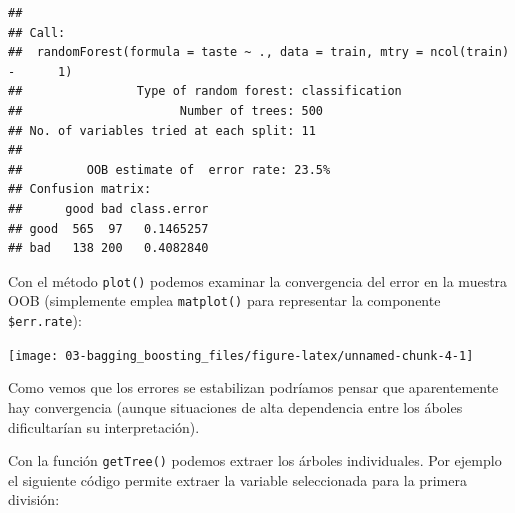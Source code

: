 \documentclass[]{book}
\newenvironment{Shaded}{\begin{snugshade}}{\end{snugshade}}
\newcommand{\KeywordTok}[1]{\textcolor[rgb]{0.13,0.29,0.53}{\textbf{#1}}}
\newcommand{\DataTypeTok}[1]{\textcolor[rgb]{0.13,0.29,0.53}{#1}}
\newcommand{\DecValTok}[1]{\textcolor[rgb]{0.00,0.00,0.81}{#1}}
\newcommand{\StringTok}[1]{\textcolor[rgb]{0.31,0.60,0.02}{#1}}
\newcommand{\CommentTok}[1]{\textcolor[rgb]{0.56,0.35,0.01}{\textit{#1}}}
\newcommand{\OtherTok}[1]{\textcolor[rgb]{0.56,0.35,0.01}{#1}}
\newcommand{\ControlFlowTok}[1]{\textcolor[rgb]{0.13,0.29,0.53}{\textbf{#1}}}
\newcommand{\OperatorTok}[1]{\textcolor[rgb]{0.81,0.36,0.00}{\textbf{#1}}}
\newcommand{\NormalTok}[1]{#1}
\theoremstyle{break}
\theoremstyle{definition}
\theoremstyle{definition}
\theoremstyle{definition}
\theoremstyle{remark}
\begin{document}
\begin{verbatim}
## 
## Call:
##  randomForest(formula = taste ~ ., data = train, mtry = ncol(train) -      1) 
##                Type of random forest: classification
##                      Number of trees: 500
## No. of variables tried at each split: 11
## 
##         OOB estimate of  error rate: 23.5%
## Confusion matrix:
##      good bad class.error
## good  565  97   0.1465257
## bad   138 200   0.4082840
\end{verbatim}

Con el método \texttt{plot()} podemos examinar la convergencia del error
en la muestra OOB (simplemente emplea \texttt{matplot()} para
representar la componente \texttt{\$err.rate}):

\begin{Shaded}
\end{Shaded}

\begin{center}\texttt{[image: 03-bagging\_boosting\_files/figure-latex/unnamed-chunk-4-1]} \end{center}

Como vemos que los errores se estabilizan podríamos pensar que
aparentemente hay convergencia (aunque situaciones de alta dependencia
entre los áboles dificultarían su interpretación).

Con la función \texttt{getTree()} podemos extraer los árboles
individuales. Por ejemplo el siguiente código permite extraer la
variable seleccionada para la primera división:

\begin{Shaded}
\end{Shaded}
\end{document}
